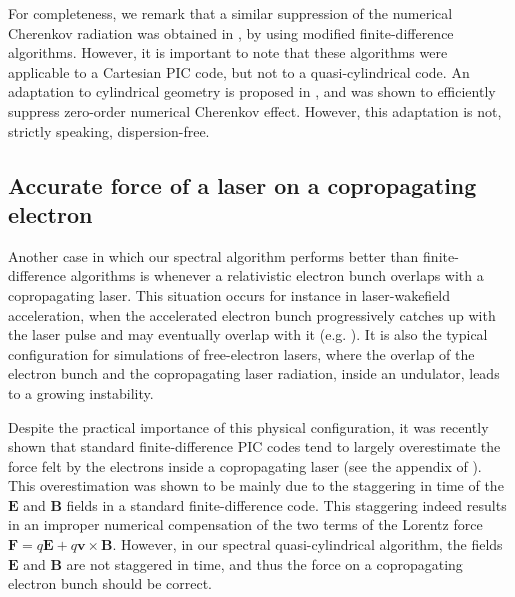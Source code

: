 \documentclass[1p,times,authoryear]{elsarticle}
\renewcommand{\vec}[1]{\boldsymbol{#1}}
\begin{document}
For completeness, we remark that a similar suppression of the
numerical Cherenkov radiation was 
obtained in \citep{LehePRSTAB2013,CowanPRSTAB2013}, by using 
modified finite-difference algorithms. However, it is important to
note that these algorithms were applicable to a Cartesian PIC code,
but not to a quasi-cylindrical code. An adaptation to
cylindrical geometry is proposed in \citep{LeheThesis}, and was 
shown to efficiently suppress zero-order numerical Cherenkov effect. However, this
adaptation is not, strictly speaking, dispersion-free. 

\subsection{Accurate force of a laser on a copropagating electron}
\label{sec:accurate-laser}

Another case in which our spectral algorithm performs better than
finite-difference algorithms is whenever a relativistic electron bunch
overlaps with a copropagating laser. This situation occurs for
instance in laser-wakefield acceleration, when the accelerated electron bunch
progressively catches up with the laser pulse and may eventually
overlap with it (e.g. \citep{CipicciaNatPhys2011,NemethPRL2008}). It is also the typical
configuration for simulations of free-electron lasers, where the
overlap of the electron bunch and the copropagating laser radiation, inside an
undulator, leads to a growing instability.

Despite the practical importance of this physical configuration, it
was recently shown that standard finite-difference PIC codes tend 
to largely overestimate the force felt by the electrons inside a
copropagating laser (see the appendix of \citep{LehePRSTAB2014}). This
overestimation was shown to be mainly due to the staggering in time 
of the $\vec{E}$ and $\vec{B}$ fields in a standard finite-difference
code. This staggering indeed results in an improper numerical compensation of 
the two terms of the Lorentz force $\vec{F} = q\vec{E} +
q\vec{v}\times\vec{B}$. However, in our spectral quasi-cylindrical
algorithm, the fields $\vec{E}$ and $\vec{B}$ are not staggered in
time, and thus the force on a copropagating electron bunch should be
correct.
\end{document}
